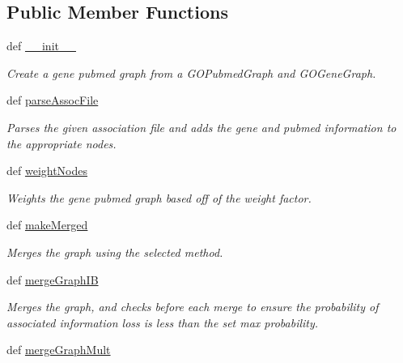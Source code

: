 \subsection*{Public Member Functions}
\begin{DoxyCompactItemize}
\item 
def \hyperlink{classgographer_1_1_g_o_gene_pubmed_graph_1_1_g_o_gene_pubmed_graph_abfbc7f7350246a08877847e8caaf4a7e}{\-\_\-\-\_\-init\-\_\-\-\_\-}
\begin{DoxyCompactList}\small\item\em Create a gene pubmed graph from a G\-O\-Pubmed\-Graph and G\-O\-Gene\-Graph. \end{DoxyCompactList}\item 
def \hyperlink{classgographer_1_1_g_o_gene_pubmed_graph_1_1_g_o_gene_pubmed_graph_a86edce00d51c5ed23e6f2dbff3edecf6}{parse\-Assoc\-File}
\begin{DoxyCompactList}\small\item\em Parses the given association file and adds the gene and pubmed information to the appropriate nodes. \end{DoxyCompactList}\item 
def \hyperlink{classgographer_1_1_g_o_gene_pubmed_graph_1_1_g_o_gene_pubmed_graph_adb93d9944cbe668abd89f0cbb2eccc8a}{weight\-Nodes}
\begin{DoxyCompactList}\small\item\em Weights the gene pubmed graph based off of the weight factor. \end{DoxyCompactList}\item 
def \hyperlink{classgographer_1_1_g_o_gene_pubmed_graph_1_1_g_o_gene_pubmed_graph_a7b3fe16973f4a2c382098883571c4ec2}{make\-Merged}
\begin{DoxyCompactList}\small\item\em Merges the graph using the selected method. \end{DoxyCompactList}\item 
def \hyperlink{classgographer_1_1_g_o_gene_pubmed_graph_1_1_g_o_gene_pubmed_graph_a0411946b8708273b12b97690c52ce35f}{merge\-Graph\-I\-B}
\begin{DoxyCompactList}\small\item\em Merges the graph, and checks before each merge to ensure the probability of associated information loss is less than the set max probability. \end{DoxyCompactList}\item 
def \hyperlink{classgographer_1_1_g_o_gene_pubmed_graph_1_1_g_o_gene_pubmed_graph_a1c7adf21bb9b5e03699b44da64dd3f75}{merge\-Graph\-Mult}

\end{DoxyCompactItemize}

